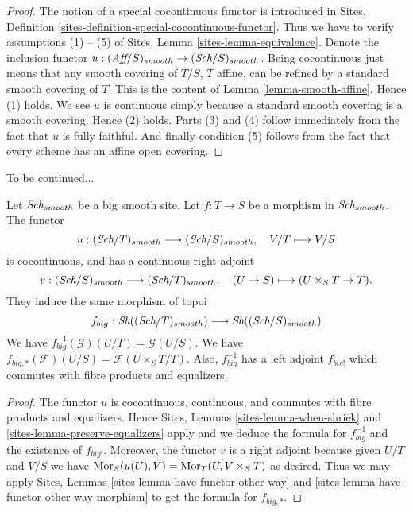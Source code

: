 \begin{proof}
The notion of a special cocontinuous functor is introduced in
Sites, Definition \ref{sites-definition-special-cocontinuous-functor}.
Thus we have to verify assumptions (1) -- (5) of
Sites, Lemma \ref{sites-lemma-equivalence}.
Denote the inclusion functor
$u : (\textit{Aff}/S)_{smooth} \to (\textit{Sch}/S)_{smooth}$.
Being cocontinuous just means that any smooth covering of
$T/S$, $T$ affine, can be refined by a standard smooth covering of $T$.
This is the content of
Lemma \ref{lemma-smooth-affine}.
Hence (1) holds. We see $u$ is continuous simply because a standard
smooth covering is a smooth covering. Hence (2) holds.
Parts (3) and (4) follow immediately from the fact that $u$ is
fully faithful. And finally condition (5) follows from the
fact that every scheme has an affine open covering.
\end{proof}

\noindent
To be continued...

\begin{lemma}
\label{lemma-morphism-big-smooth}
Let $\textit{Sch}_{smooth}$ be a big smooth site.
Let $f : T \to S$ be a morphism in $\textit{Sch}_{smooth}$.
The functor
$$
u : (\textit{Sch}/T)_{smooth} \longrightarrow (\textit{Sch}/S)_{smooth},
\quad
V/T \longmapsto V/S
$$
is cocontinuous, and has a continuous right adjoint
$$
v : (\textit{Sch}/S)_{smooth} \longrightarrow (\textit{Sch}/T)_{smooth},
\quad
(U \to S) \longmapsto (U \times_S T \to T).
$$
They induce the same morphism of topoi
$$
f_{big} :
\mathop{\textit{Sh}}\nolimits((\textit{Sch}/T)_{smooth})
\longrightarrow
\mathop{\textit{Sh}}\nolimits((\textit{Sch}/S)_{smooth})
$$
We have $f_{big}^{-1}(\mathcal{G})(U/T) = \mathcal{G}(U/S)$.
We have $f_{big, *}(\mathcal{F})(U/S) = \mathcal{F}(U \times_S T/T)$.
Also, $f_{big}^{-1}$ has a left adjoint $f_{big!}$ which commutes with
fibre products and equalizers.
\end{lemma}

\begin{proof}
The functor $u$ is cocontinuous, continuous, and commutes with fibre products
and equalizers. Hence
Sites, Lemmas \ref{sites-lemma-when-shriek} and
\ref{sites-lemma-preserve-equalizers}
apply and we deduce the formula
for $f_{big}^{-1}$ and the existence of $f_{big!}$. Moreover,
the functor $v$ is a right adjoint because given $U/T$ and $V/S$
we have $\mathop{\rm Mor}\nolimits_S(u(U), V) = \mathop{\rm Mor}\nolimits_T(U, V \times_S T)$
as desired. Thus we may apply
Sites, Lemmas \ref{sites-lemma-have-functor-other-way} and
\ref{sites-lemma-have-functor-other-way-morphism} to get the
formula for $f_{big, *}$.
\end{proof}











